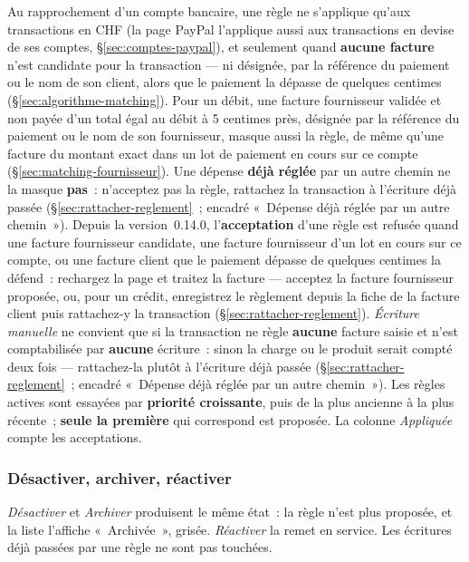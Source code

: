 \documentclass[a4paper,11pt,oneside]{article}
\begin{document}
Au rapprochement d'un compte bancaire, une règle ne s'applique qu'aux transactions en CHF (la page PayPal l'applique aussi aux transactions en devise de ses comptes, \S\ref{sec:comptes-paypal}), et seulement quand \textbf{aucune facture} n'est candidate pour la transaction --- ni désignée, par la référence du paiement ou le nom de son client, alors que le paiement la dépasse de quelques centimes (\S\ref{sec:algorithme-matching}). Pour un débit, une facture fournisseur validée et non payée d'un total égal au débit à 5 centimes près, désignée par la référence du paiement ou le nom de son fournisseur, masque aussi la règle, de même qu'une facture du montant exact dans un lot de paiement en cours sur ce compte (\S\ref{sec:matching-fournisseur}). Une dépense \textbf{déjà réglée} par un autre chemin ne la masque \textbf{pas}~: n'acceptez pas la règle, rattachez la transaction à l'écriture déjà passée (\S\ref{sec:rattacher-reglement}~; encadré «~Dépense déjà réglée par un autre chemin~»). Depuis la version~0.14.0, l'\textbf{acceptation} d'une règle est refusée quand une facture fournisseur candidate, une facture fournisseur d'un lot en cours sur ce compte, ou une facture client que le paiement dépasse de quelques centimes la défend~: rechargez la page et traitez la facture --- acceptez la facture fournisseur proposée, ou, pour un crédit, enregistrez le règlement depuis la fiche de la facture client puis rattachez-y la transaction (\S\ref{sec:rattacher-reglement}). \emph{Écriture manuelle} ne convient que si la transaction ne règle \textbf{aucune} facture saisie et n'est comptabilisée par \textbf{aucune} écriture~: sinon la charge ou le produit serait compté deux fois --- rattachez-la plutôt à l'écriture déjà passée (\S\ref{sec:rattacher-reglement}~; encadré «~Dépense déjà réglée par un autre chemin~»). Les règles actives sont essayées par \textbf{priorité croissante}, puis de la plus ancienne à la plus récente~; \textbf{seule la première} qui correspond est proposée. La colonne \emph{Appliquée} compte les acceptations.

\subsubsection{Désactiver, archiver, réactiver}

\emph{Désactiver} et \emph{Archiver} produisent le même état~: la règle n'est plus proposée, et la liste l'affiche «~Archivée~», grisée. \emph{Réactiver} la remet en service. Les écritures déjà passées par une règle ne sont pas touchées.
\end{document}
